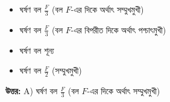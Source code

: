 \documentclass[12pt, a4paper]{article}
\begin{document}
\begin{itemize}[label={}, leftmargin=1cm, itemsep=0.5em]
    \item[\textbf{A)}] ঘর্ষণ বল $\frac{F}{3}$ (বল $F$-এর দিকে অর্থাৎ সম্মুখমুখী)
    \item[\textbf{B)}] ঘর্ষণ বল $\frac{F}{3}$ (বল $F$-এর বিপরীত দিকে অর্থাৎ পশ্চাৎমুখী)
    \item[\textbf{C)}] ঘর্ষণ বল শূন্য
    \item[\textbf{D)}] ঘর্ষণ বল $\frac{F}{2}$ (সম্মুখমুখী)
\end{itemize}

\vspace{0.5em}
\begin{tcolorbox}[answerbox]
    \textbf{\color{success} উত্তর:} A) ঘর্ষণ বল $\frac{F}{3}$ (বল $F$-এর দিকে অর্থাৎ সম্মুখমুখী)
\end{tcolorbox}
\vspace{1em}
\end{document}
